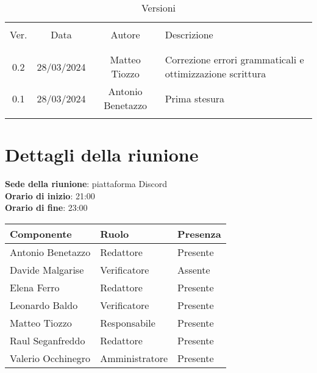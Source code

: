 \documentclass[italian,12pt]{article} %
\begin{document}


\newpage



\begin{table}[!h]
	\caption{Versioni}
	\begin{center}
		\begin{tabular}{ c c c p{9cm} }
			\hline                                                                                 \\[-2ex]
			Ver. & Data       & Autore             & Descrizione                                   \\
			\\[-2ex] \hline \\[-1.5ex]
			0.2 & 28/03/2024 & Matteo Tiozzo & Correzione errori grammaticali e ottimizzazione scrittura \\
			0.1  & 28/03/2024 & Antonio Benetazzo & Prima stesura                                  \\
			\\[-1.5ex] \hline
		\end{tabular}
	\end{center}
\end{table}

\newpage

\tableofcontents

\newpage

\section{Dettagli della riunione}


\textbf{Sede della riunione}: piattaforma Discord\\
\textbf{Orario di inizio}: 21:00\\
\textbf{Orario di fine}: 23:00\\


\begin{flushleft}
	\begin{table}[!h]
	\begin{tabular}{ |l|l|l| } 
		\hline
		\textbf{Componente} & \textbf{Ruolo} & \textbf{Presenza} \\
		\hline 
		Antonio Benetazzo 	& Redattore           & Presente \\
		Davide Malgarise 	& Verificatore        & Assente  \\
		Elena Ferro 		& Redattore           & Presente \\
		Leonardo Baldo 		& Verificatore        & Presente \\ 
		Matteo Tiozzo 		& Responsabile        & Presente \\ 
		Raul Seganfreddo 	& Redattore           & Presente \\
		Valerio Occhinegro 	& Amministratore      & Presente \\
		\hline
	\end{tabular}
	\end{table}
\end{flushleft}
\end{document}
